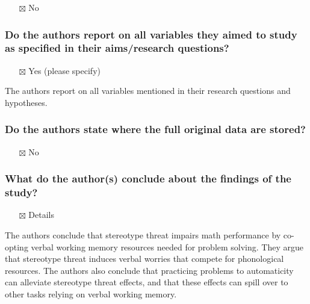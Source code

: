 \documentclass[
  doc, a4paper]{apa7}
\providecommand{\tightlist}{%
  \setlength{\itemsep}{0pt}\setlength{\parskip}{0pt}}
\begin{document}
\begin{itemize}
\tightlist
\item[$\boxtimes$]
  No
\end{itemize}

\subsubsection{Do the authors report on all variables they aimed to study as specified in their aims/research questions?}\label{do-the-authors-report-on-all-variables-they-aimed-to-study-as-specified-in-their-aimsresearch-questions}

\begin{itemize}
\tightlist
\item[$\boxtimes$]
  Yes (please specify)
\end{itemize}

The authors report on all variables mentioned in their research questions and hypotheses.

\subsubsection{Do the authors state where the full original data are stored?}\label{do-the-authors-state-where-the-full-original-data-are-stored}

\begin{itemize}
\tightlist
\item[$\boxtimes$]
  No
\end{itemize}

\subsubsection{What do the author(s) conclude about the findings of the study?}\label{what-do-the-authors-conclude-about-the-findings-of-the-study}

\begin{itemize}
\tightlist
\item[$\boxtimes$]
  Details
\end{itemize}

The authors conclude that stereotype threat impairs math performance by co-opting verbal working memory resources needed for problem solving. They argue that stereotype threat induces verbal worries that compete for phonological resources. The authors also conclude that practicing problems to automaticity can alleviate stereotype threat effects, and that these effects can spill over to other tasks relying on verbal working memory.
\end{document}
